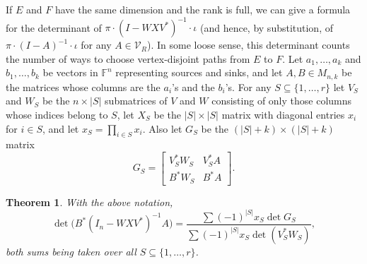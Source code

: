 \documentclass{amsart}
\newtheorem{thm}{Theorem}[section]
\theoremstyle{definition}
\begin{document}
If $E$ and $F$ have the same dimension and the rank is full, we can give a formula for the determinant of $\pi\cdot (I - WXV^*)^{-1}\cdot \iota$ (and hence, by substitution, of $\pi\cdot (I - A)^{-1}\cdot \iota$ for any $A \in \mathcal{V}_R$). In some loose sense, this determinant counts the number of ways to choose vertex-disjoint paths from $E$ to $F$. Let $a_1, \ldots, a_k$ and $b_1, \ldots, b_k$ be vectors in $\mathbb{F}^n$ representing sources and sinks, and let $A, B \in M_{n,k}$ be the matrices whose columns are the $a_i$'s and the $b_i$'s. For any $S \subseteq \{1, \ldots, r\}$ let $V_S$ and $W_S$ be the $n \times |S|$ submatrices of $V$ and $W$ consisting of only those columns whose indices belong to $S$, let $X_S$ be the $|S| \times |S|$ matrix with diagonal entries $x_i$ for $i \in S$, and let $x_S = \prod_{i \in S} x_i$. Also let $G_S$ be the $(|S| + k) \times (|S| + k)$ matrix $$ G_S = \left[\begin{matrix} V_S^* W_S & V_S^* A \\ B^* W_S & B^* A \end{matrix}\right].$$

\begin{thm}\label{lgthm}
With the above notation, $$\det\Big( B^* (I_n - WXV^*)^{-1} A \Big) = \frac{ \displaystyle \sum (-1)^{|S|} x_S \det G_S }{ \displaystyle \sum (-1)^{|S|} x_S \det(V_S^* W_S)},$$ both sums being taken over all $S \subseteq \{1, \ldots, r\}$.
\end{thm}
\end{document}
